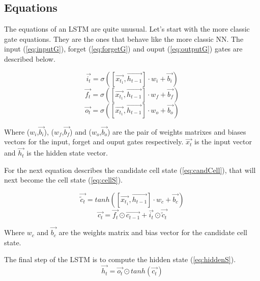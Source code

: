 \subsection{Equations}

The equations of an LSTM are quite unusual.
Let's start with the more classic gate equations. They are the ones that behave like the more classic \ac{NN}.
The input (\cref{eq:inputG}), forget (\cref{eq:forgetG}) and ouput (\cref{eq:outputG}) gates are described below.


\begin{equation}\label{eq:inputG}
  \overrightarrow{i_t}=\sigma ([\overrightarrow{x_{t_1}},\overrightarrow{h_{t-1}}]\cdot w_i + \overrightarrow{b_i})
\end{equation}
\begin{equation}\label{eq:forgetG}
  \overrightarrow{f_t}=\sigma ([\overrightarrow{x_{t_1}},\overrightarrow{h_{t-1}}]\cdot w_f + \overrightarrow{b_f})
\end{equation}
\begin{equation}\label{eq:outputG}
  \overrightarrow{o_t}=\sigma ([\overrightarrow{x_{t_1}},\overrightarrow{h_{t-1}}]\cdot w_o + \overrightarrow{b_o})
\end{equation}

Where ($w_i$,$\overrightarrow{b_i}$), ($w_f$,$\overrightarrow{b_f}$) and ($w_o$,$\overrightarrow{b_o}$) are the pair of weights matrixes and biases vectors for the input, forget and ouput gates respectively. $\overrightarrow{x_t}$ is the input vector and $\overrightarrow{h_t}$ is the hidden state vector.

For the next equation describes the candidate cell state (\cref{eq:candCell}), that will next become the cell state (\cref{eq:cellS}).

\begin{equation}\label{eq:candCell}
  \overrightarrow{\tilde{c}_t}=tanh([\overrightarrow{x_{t_1}},\overrightarrow{h_{t-1}}]\cdot w_c+ \overrightarrow{b_c})
\end{equation}
\begin{equation}\label{eq:cellS}
  \overrightarrow{c_t}=\overrightarrow{f_t}\odot \overrightarrow{c_{t-1}} + \overrightarrow{i_t} \odot \overrightarrow{\tilde{c}_t}
\end{equation}

Where $w_c$ and $\overrightarrow{b_c}$ are the weights matrix and bias vector for the candidate cell state.

The final step of the \ac{LSTM} is to compute the hidden state (\cref{eq:hiddenS}).
\begin{equation}\label{eq:hiddenS}
  \overrightarrow{h_t}=\overrightarrow{o_t}\odot tanh(\overrightarrow{c_t})
\end{equation}

